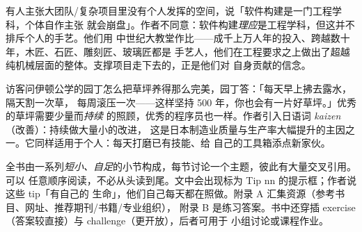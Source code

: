 
\begin{ideabox}
有人主张大团队/复杂项目里没有个人发挥的空间，说「软件构建是一门工程学科，个体自作主张
就会崩盘」。作者不同意：软件构建\emph{理应}是工程学科，但这并不排斥个人的手艺。他们用
中世纪大教堂作比——成千上万人年的投入、跨越数十年，木匠、石匠、雕刻匠、玻璃匠都是
手艺人，他们在工程要求之上做出了超越纯机械层面的整体。支撑项目走下去的，正是他们对
自身贡献的信念。
\end{ideabox}

\begin{bitext}
\end{bitext}



\begin{ideabox}
访客问伊顿公学的园丁怎么把草坪养得那么完美，园丁答：「每天早上拂去露水，隔天割一次草，
每周滚压一次——这样坚持 500 年，你也会有一片好草坪。」优秀的草坪需要少量而\emph{持续}
的照顾，优秀的程序员也一样。作者引入日语词 \emph{kaizen}（改善）：持续做大量小的改进，
这是日本制造业质量与生产率大幅提升的主因之一。它同样适用于个人：每天打磨已有技能、给
自己的工具箱添点新家伙。
\end{ideabox}



\begin{ideabox}
全书由一系列\emph{短小、自足}的小节构成，每节讨论一个主题，彼此有大量交叉引用。可以
任意顺序阅读，不必从头读到尾。文中会出现标为 Tip nn 的提示框；作者说这些 tip「有自己的
生命」，他们自己每天都在照做。附录 A 汇集资源（参考书目、网址、推荐期刊/书籍/专业组织），
附录 B 是练习答案。书中还穿插 exercise（答案较直接）与 challenge（更开放），后者可用于
小组讨论或课程作业。
\end{ideabox}

